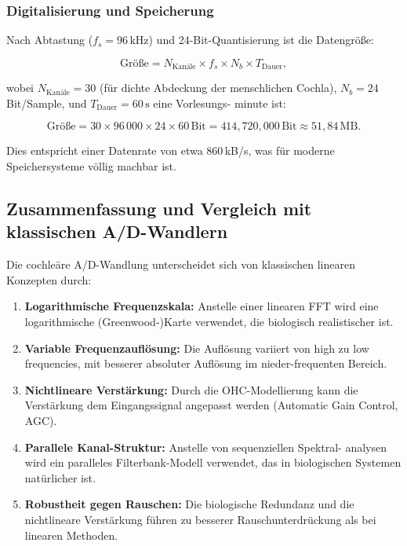 ﻿\documentclass[12pt, a4paper]{article}
\theoremstyle{definition}
\theoremstyle{remark}
\begin{document}
\subsubsection{Digitalisierung und Speicherung}

Nach Abtastung ($f_s = 96\,\mathrm{kHz}$) und 24-Bit-Quantisierung ist die Datengröße:

\begin{equation}
\label{eq:data_size}
\text{Größe} = N_{\text{Kanäle}} \times f_s \times N_b \times T_{\text{Dauer}},
\end{equation}

wobei $N_{\text{Kanäle}} = 30$ (für dichte Abdeckung der menschlichen Cochla), 
$N_b = 24$ Bit/Sample, und $T_{\text{Dauer}} = 60\,\mathrm{s}$ eine Vorlesungs-
minute ist:

\begin{equation}
\text{Größe} = 30 \times 96\,000 \times 24 \times 60 \, \text{Bit}
= 414{,}720{,}000 \, \text{Bit} 
\approx 51{,}84 \, \mathrm{MB}.
\end{equation}

Dies entspricht einer Datenrate von etwa 860\,kB/s, was für moderne 
Speichersysteme völlig machbar ist.

\subsection{Zusammenfassung und Vergleich mit klassischen A/D-Wandlern}

Die cochleäre A/D-Wandlung unterscheidet sich von klassischen linearen Konzepten 
durch:

\begin{enumerate}
\item \textbf{Logarithmische Frequenzskala:} Anstelle einer linearen FFT wird 
  eine logarithmische (Greenwood-)Karte verwendet, die biologisch realistischer ist.

\item \textbf{Variable Frequenzauflösung:} Die Auflösung variiert von high zu low 
  frequencies, mit besserer absoluter Auflösung im nieder-frequenten Bereich.

\item \textbf{Nichtlineare Verstärkung:} Durch die OHC-Modellierung kann die 
  Verstärkung dem Eingangssignal angepasst werden (Automatic Gain Control, AGC).

\item \textbf{Parallele Kanal-Struktur:} Anstelle von sequenziellen Spektral-
  analysen wird ein paralleles Filterbank-Modell verwendet, das in biologischen 
  Systemen natürlicher ist.

\item \textbf{Robustheit gegen Rauschen:} Die biologische Redundanz und die 
  nichtlineare Verstärkung führen zu besserer Rauschunterdrückung als bei 
  linearen Methoden.
\end{enumerate}
\end{document}
